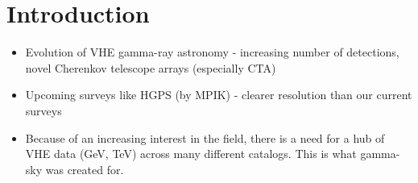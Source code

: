 \section{Introduction}


%
%  

\begin{itemize}

\item Evolution of VHE gamma-ray astronomy - increasing number of detections, novel Cherenkov telescope arrays (especially CTA)

\item Upcoming surveys like HGPS (by MPIK) - clearer resolution than our current surveys

\item Because of an increasing interest in the field, there is a need for a hub of VHE data (GeV, TeV) across many different catalogs.
This is what gamma-sky was created for.

\end{itemize}

